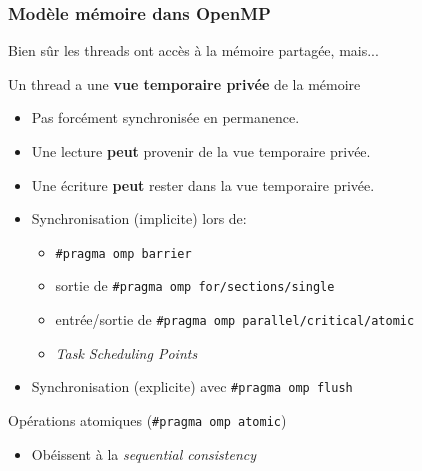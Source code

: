 \documentclass[xcolor={x11names,svgnames},x11names,svgnames]{beamer}
\begin{document}
\begin{frame}[label=omp_memory_model]
\frametitle{Modèle mémoire dans OpenMP}


Bien sûr les threads ont accès à la mémoire partagée, mais...


\begin{alertblock}{Un thread a une \textbf{vue temporaire privée} de la mémoire}
  \begin{itemize}
  \item Pas forcément synchronisée en permanence.

  \item Une lecture \textbf{peut} provenir de la vue temporaire privée.
    
  \item Une écriture \textbf{peut} rester dans la vue temporaire privée.

  \item Synchronisation (implicite) lors de:
    \begin{itemize}
    \item \texttt{\#pragma omp barrier}
    \item sortie de \texttt{\#pragma omp for/sections/single}
    \item entrée/sortie de \texttt{\#pragma omp parallel/critical/atomic}
    \item \emph{Task Scheduling Points}
    \end{itemize}

  \item Synchronisation (explicite) avec \texttt{\#pragma omp flush}
  \end{itemize}
\end{alertblock}

  \begin{exampleblock}{Opérations atomiques (\texttt{\#pragma omp atomic})}
    \begin{itemize}
    \item Obéissent à la \emph{sequential consistency}
    \end{itemize}
  \end{exampleblock}

\end{frame}
\end{document}
